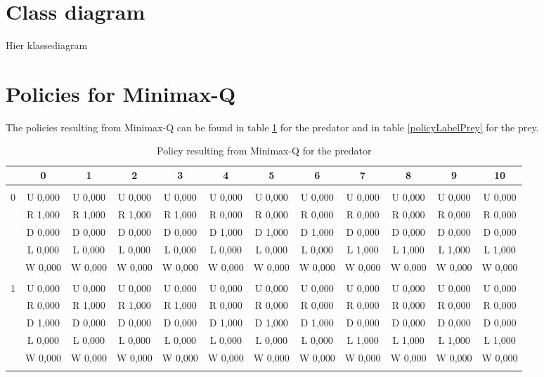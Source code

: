 \newpage
\appendix
\appendixpage

\section{Class diagram} \label{app:classDiagram}

Hier klassediagram

\section{Policies for Minimax-Q} \label{app:policiesM}
The policies resulting from Minimax-Q can be found in table \ref{policyLabelPred} for the predator and in table \ref{policyLabelPrey} for the prey.

\begin{table}[htbp]
\caption{Policy resulting from Minimax-Q for the predator}
\label{policyLabelPred}
\centering
\begin{footnotesize}
\begin{tabular}{c|c|c|c|c|c|c|c|c|c|c|c|}
&0&1&2&3&4&5&6&7&8&9&10\\ \hline\\
0&U 0,000&U 0,000&U 0,000&U 0,000&U 0,000&U 0,000&U 0,000&U 0,000&U 0,000&U 0,000&U 0,000\\
&R 1,000&R 1,000&R 1,000&R 1,000&R 0,000&R 0,000&R 0,000&R 0,000&R 0,000&R 0,000&R 0,000\\
&D 0,000&D 0,000&D 0,000&D 0,000&D 1,000&D 1,000&D 1,000&D 0,000&D 0,000&D 0,000&D 0,000\\
&L 0,000&L 0,000&L 0,000&L 0,000&L 0,000&L 0,000&L 0,000&L 1,000&L 1,000&L 1,000&L 1,000\\
&W 0,000&W 0,000&W 0,000&W 0,000&W 0,000&W 0,000&W 0,000&W 0,000&W 0,000&W 0,000&W 0,000\\
\hline \\
1&U 0,000&U 0,000&U 0,000&U 0,000&U 0,000&U 0,000&U 0,000&U 0,000&U 0,000&U 0,000&U 0,000\\
&R 0,000&R 1,000&R 1,000&R 1,000&R 0,000&R 0,000&R 0,000&R 0,000&R 0,000&R 0,000&R 0,000\\
&D 1,000&D 0,000&D 0,000&D 0,000&D 1,000&D 1,000&D 1,000&D 0,000&D 0,000&D 0,000&D 0,000\\
&L 0,000&L 0,000&L 0,000&L 0,000&L 0,000&L 0,000&L 0,000&L 1,000&L 1,000&L 1,000&L 1,000\\
&W 0,000&W 0,000&W 0,000&W 0,000&W 0,000&W 0,000&W 0,000&W 0,000&W 0,000&W 0,000&W 0,000\\
\hline \\

\end{tabular}
\end{footnotesize}
\end{table}
